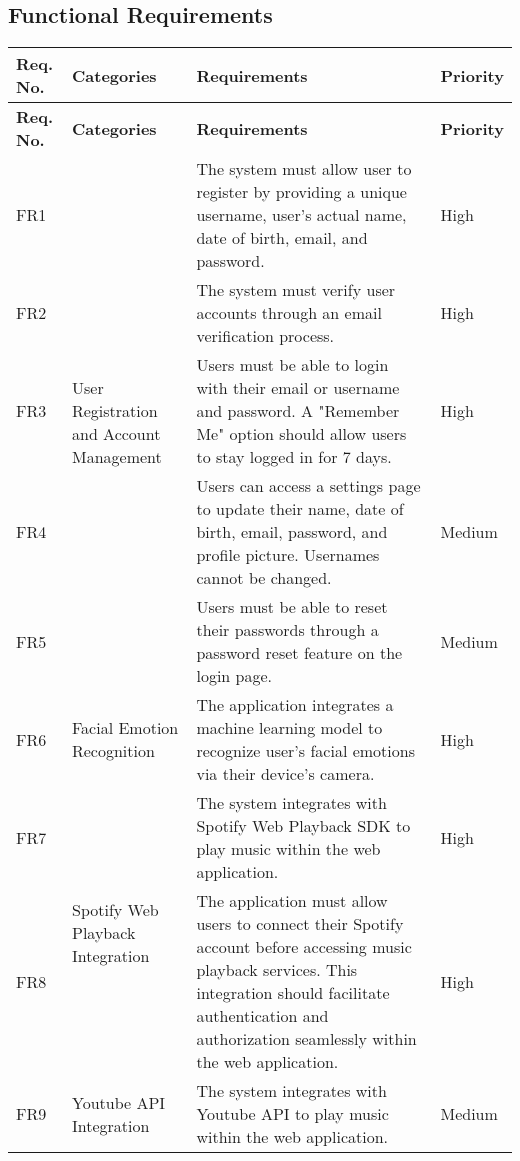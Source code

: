 \subsection{Functional Requirements}
\begin{longtable}{ |m{1cm}|m{3.5cm}|m{7cm}|m{1.5cm}| }
    \hline
    \rowcolor{lightgray}
    \textbf{Req. No.} & \textbf{Categories} & \textbf{Requirements} & \textbf{Priority} \\
    \hline
    \endfirsthead

    \hline
    \rowcolor{lightgray}
    \textbf{Req. No.} & \textbf{Categories} & \textbf{Requirements} & \textbf{Priority} \\
    \hline
    \endhead
    FR1 & \multirow{5}{=}{User Registration and Account Management} & The system must allow user to register by providing a unique username, user's actual name, date of birth, email, and password. & High \\
    \cline{1-1} \cline{3-4}
    FR2 &  & The system must verify user accounts through an email verification process. & High \\
    \cline{1-1} \cline{3-4}
    FR3 &  & Users must be able to login with their email or username and password. A "Remember Me" option should allow users to stay logged in for 7 days. & High \\
    \cline{1-1} \cline{3-4}
    FR4 &  & Users can access a settings page to update their name, date of birth, email, password, and profile picture. Usernames cannot be changed. & Medium \\
    \cline{1-1} \cline{3-4}
    FR5 &  & Users must be able to reset their passwords through a password reset feature on the login page. & Medium \\
    \hline
    FR6 & Facial Emotion Recognition & The application integrates a machine learning model to recognize user's facial emotions via their device's camera. & High \\
    \hline
    FR7 & \multirow{2}{=}{Spotify Web Playback Integration} & The system integrates with Spotify Web Playback SDK to play music within the web application. & High \\
    \cline{1-1} \cline{3-4}
    FR8 &  & The application must allow users to connect their Spotify account before accessing music playback services. This integration should facilitate authentication and authorization seamlessly within the web application. & High \\
    \hline
    FR9 & \multirow{2}{=}{Youtube API Integration} & The system integrates with Youtube API to play music within the web application. & Medium \\

\end{longtable}
